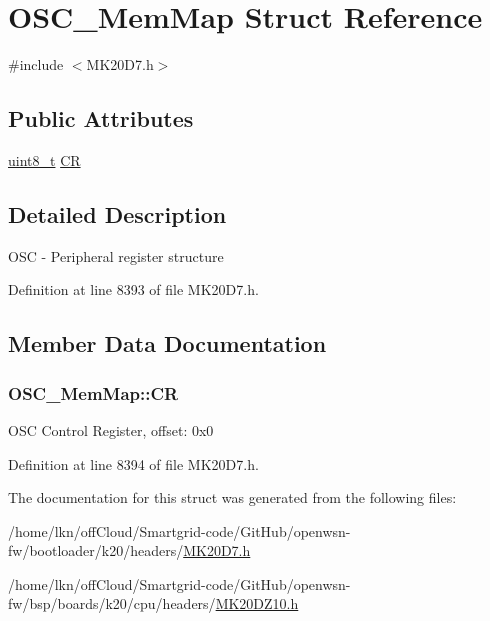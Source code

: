\hypertarget{struct_o_s_c___mem_map}{}\section{O\+S\+C\+\_\+\+Mem\+Map Struct Reference}
\label{struct_o_s_c___mem_map}


{\ttfamily \#include $<$M\+K20\+D7.\+h$>$}

\subsection*{Public Attributes}
\begin{DoxyCompactItemize}
\item 
\hyperlink{_p_e___types_8h_aba7bc1797add20fe3efdf37ced1182c5}{uint8\+\_\+t} \hyperlink{struct_o_s_c___mem_map_adb3c443099915a22c9951ff23c8eaa16}{CR}
\end{DoxyCompactItemize}


\subsection{Detailed Description}
O\+SC -\/ Peripheral register structure 

Definition at line 8393 of file M\+K20\+D7.\+h.



\subsection{Member Data Documentation}
\subsubsection[{\texorpdfstring{CR}{CR}}]{ O\+S\+C\+\_\+\+Mem\+Map\+::\+CR}\hypertarget{struct_o_s_c___mem_map_adb3c443099915a22c9951ff23c8eaa16}{}\label{struct_o_s_c___mem_map_adb3c443099915a22c9951ff23c8eaa16}
O\+SC Control Register, offset\+: 0x0 

Definition at line 8394 of file M\+K20\+D7.\+h.



The documentation for this struct was generated from the following files\+:\begin{DoxyCompactItemize}
\item 
/home/lkn/off\+Cloud/\+Smartgrid-\/code/\+Git\+Hub/openwsn-\/fw/bootloader/k20/headers/\hyperlink{bootloader_2k20_2headers_2_m_k20_d7_8h}{M\+K20\+D7.\+h}\item 
/home/lkn/off\+Cloud/\+Smartgrid-\/code/\+Git\+Hub/openwsn-\/fw/bsp/boards/k20/cpu/headers/\hyperlink{_m_k20_d_z10_8h}{M\+K20\+D\+Z10.\+h}\end{DoxyCompactItemize}
